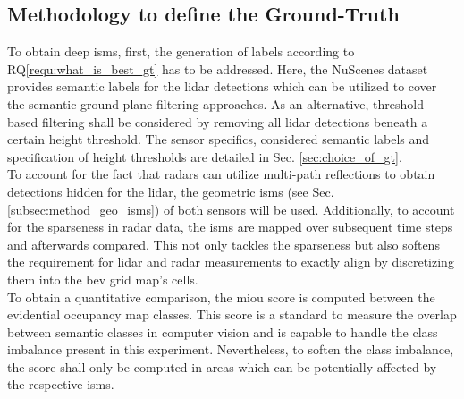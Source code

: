 \subsection{Methodology to define the Ground-Truth}
\label{subsec:method_choice_of_gt}
To obtain deep \gls{ism}s, first, the generation of labels according to RQ\ref{requ:what_is_best_gt} has to be addressed. Here, the NuScenes dataset provides semantic labels for the lidar detections which can be utilized to cover the semantic ground-plane filtering approaches. As an alternative, threshold-based filtering shall be considered by removing all lidar detections beneath a certain height threshold. The sensor specifics, considered semantic labels and specification of height thresholds are detailed in Sec. \ref{sec:choice_of_gt}.
\\
To account for the fact that radars can utilize multi-path reflections to obtain detections hidden for the lidar, the geometric \gls{ism}s (see Sec. \ref{subsec:method_geo_isms}) of both sensors will be used. Additionally, to account for the sparseness in radar data, the \gls{ism}s are mapped over subsequent time steps and afterwards compared. This not only tackles the sparseness but also softens the requirement for lidar and radar measurements to exactly align by discretizing them into the \gls{bev} grid map's cells. 
\\
To obtain a quantitative comparison, the m\gls{iou} score is computed between the evidential occupancy map classes. This score is a standard to measure the overlap between semantic classes in computer vision and is capable to handle the class imbalance present in this experiment. Nevertheless, to soften the class imbalance, the score shall only be computed in areas which can be potentially affected by the respective \gls{ism}s. 
%
